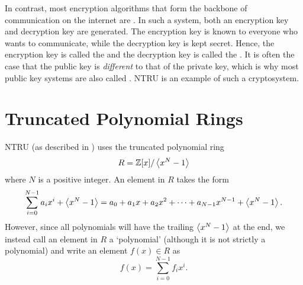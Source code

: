 In contrast, most encryption algorithms that form the backbone of communication on the internet are . In such a system, both an encryption key and decryption key are generated. The encryption key is known to everyone who wants to communicate, while the decryption key is kept secret. Hence, the encryption key is called the  and the decryption key is called the . It is often the case that the public key is \textit{different} to that of the private key, which is why most public key systems are also called . NTRU is an example of such a cryptosystem.

\section{Truncated Polynomial Rings}
NTRU (as described in \cite[\S 1.1]{hoffstein_pipher_silverman_1998}) uses the truncated polynomial ring
\[
    R = \mathbb{Z}[x] / \left\langle x^N - 1\right\rangle
\]
where $N$ is a positive integer. An element in $R$ takes the form
\[
    \sum_{i=0}^{N-1}a_ix^i + \left\langle x^N - 1\right\rangle = a_0 + a_1x + a_2x^2 + \cdots + a_{N-1}x^{N-1} + \left\langle x^N - 1\right\rangle.
\]
However, since all polynomials will have the trailing $\left\langle x^N - 1\right\rangle$ at the end, we instead call an element in $R$ a `polynomial' (although it is not strictly a polynomial) and write an element $f(x) \in R$ as
\[
    f(x) = \sum_{i=0}^{N-1}f_ix^i.
\]

